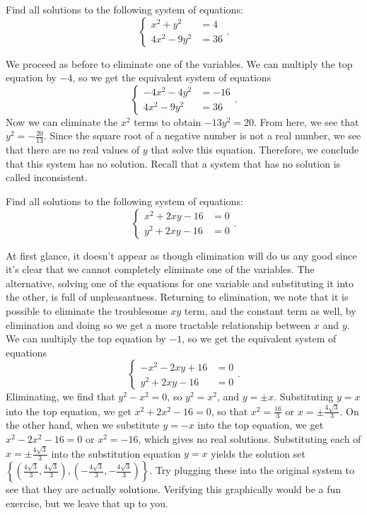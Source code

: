 \documentclass[nooutcomes]{ximera}
\begin{document}
\begin{example}
Find all solutions to the following system of equations:
$$
\begin{cases}
x^2 + y^2 & =  4 \\
4x^2 - 9y^2 & = 36
\end{cases}.
$$
\end{example}
\begin{explanation}
We proceed as before to eliminate one of the variables. We can multiply the top equation by $-4$, so we get the equivalent system of equations
$$
\begin{cases}
-4x^2 - 4y^2 & =  -16 \\
4x^2 - 9y^2 & = 36
\end{cases}.
$$
Now we can eliminate the $x^2$ terms to obtain $-13y^2 = 20$. From here, we see that $y^2 = -\frac{20}{13}$. Since the square root of a negative number is not a real number, we see that there are no real values of $y$ that solve this equation. Therefore, we conclude that this system has no solution. Recall that a system that has no solution is called inconsistent. 
\end{explanation}

\begin{example}
Find all solutions to the following system of equations:
$$
\begin{cases}
x^2 + 2xy - 16 & =  0 \\
y^2 + 2xy - 16 & = 0
\end{cases}.
$$
\end{example}
\begin{explanation}
At first glance, it doesn’t appear as though elimination will do us any good since it’s clear
that we cannot completely eliminate one of the variables. The alternative, solving one of
the equations for one variable and substituting it into the other, is full of unpleasantness.
Returning to elimination, we note that it is possible to eliminate the troublesome $xy$ term,
and the constant term as well, by elimination and doing so we get a more tractable relationship between $x$ and $y$. We can multiply the top equation by $-1$, so we get the equivalent system of equations
$$
\begin{cases}
-x^2 - 2xy + 16 & =  0 \\
y^2 + 2xy - 16 & = 0
\end{cases}.
$$
Eliminating, we find that $y^2 - x^2 = 0$, so $y^2 = x^2$, and $y = \pm x$. Substituting $y = x$ into the top equation, we get $x^2 + 2x^2 - 16 = 0$, so that $x^2 = \frac{16}{3}$ or $x = \pm \frac{4\sqrt{3}}{3}$.  On the other hand, when we substitute $y = -x$ into the top equation, we get $x^2 - 2x^2 - 16 = 0$ or $x^2 = -16$, which gives no real solutions. Substituting each of $x = \pm \frac{4\sqrt{3}}{3}$ into the substitution equation $y = x$ yields the solution set $\left\{\left(\frac{4\sqrt{3}}{3}, \frac{4\sqrt{3}}{3}\right), \left(-\frac{4\sqrt{3}}{3}, -\frac{4\sqrt{3}}{3}\right)\right\}$. Try plugging these into the original system to see that they are actually solutions. Verifying this graphically would be a fun exercise, but we leave that up to you. 
\end{explanation}
\end{document}
